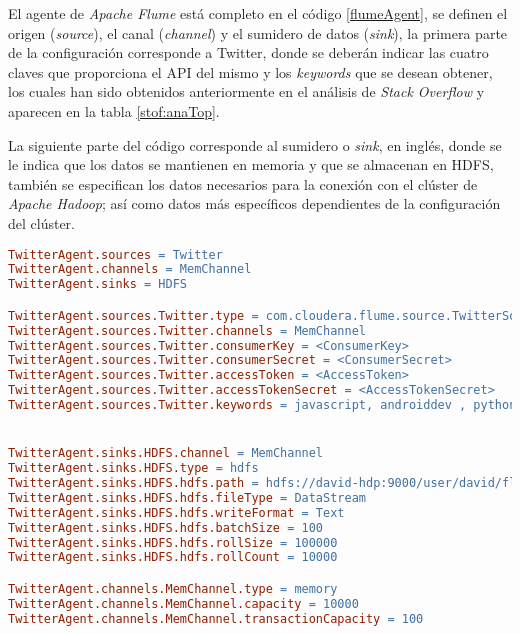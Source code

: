 El agente de \textit{Apache Flume} está completo en el código \ref{flumeAgent}, se definen el origen (\textit{source}), el canal (\textit{channel}) y el sumidero de datos (\textit{sink}), la primera parte de la configuración corresponde a Twitter, donde se deberán indicar las cuatro claves que proporciona el \gls{API} del mismo y los \textit{keywords} que se desean obtener, los cuales han sido obtenidos anteriormente en el análisis de \textit{Stack Overflow} y aparecen en la tabla \ref{stof:anaTop}.

La siguiente parte del código corresponde al sumidero o \textit{sink}, en inglés, donde se le indica que los datos se mantienen en memoria y que se almacenan en \gls{HDFS}, también se especifican los datos necesarios para la conexión con el clúster de \textit{Apache Hadoop}; así como datos más específicos dependientes de la configuración del clúster.

\begin{lstlisting}[label=flumeAgent,language=make,frame=single,caption=Fichero de configuración del agente de \textit{Apache Flume} para \textit{Twitter}.]
TwitterAgent.sources = Twitter
TwitterAgent.channels = MemChannel
TwitterAgent.sinks = HDFS

TwitterAgent.sources.Twitter.type = com.cloudera.flume.source.TwitterSource
TwitterAgent.sources.Twitter.channels = MemChannel
TwitterAgent.sources.Twitter.consumerKey = <ConsumerKey>
TwitterAgent.sources.Twitter.consumerSecret = <ConsumerSecret>
TwitterAgent.sources.Twitter.accessToken = <AccessToken>
TwitterAgent.sources.Twitter.accessTokenSecret = <AccessTokenSecret>
TwitterAgent.sources.Twitter.keywords = javascript, androiddev , python , c++ , php , iosdev , html, kotlin, php, typescript, powershell, git, github, groovy, maven, cplusplus, springboot, haskell, androidstudio, intellij, netbeans, oracle, mysql, cprograming, c#


TwitterAgent.sinks.HDFS.channel = MemChannel
TwitterAgent.sinks.HDFS.type = hdfs
TwitterAgent.sinks.HDFS.hdfs.path = hdfs://david-hdp:9000/user/david/flume/tweets/%Y-%m-%d/
TwitterAgent.sinks.HDFS.hdfs.fileType = DataStream
TwitterAgent.sinks.HDFS.hdfs.writeFormat = Text
TwitterAgent.sinks.HDFS.hdfs.batchSize = 100
TwitterAgent.sinks.HDFS.hdfs.rollSize = 100000
TwitterAgent.sinks.HDFS.hdfs.rollCount = 10000

TwitterAgent.channels.MemChannel.type = memory
TwitterAgent.channels.MemChannel.capacity = 10000
TwitterAgent.channels.MemChannel.transactionCapacity = 100
\end{lstlisting}

